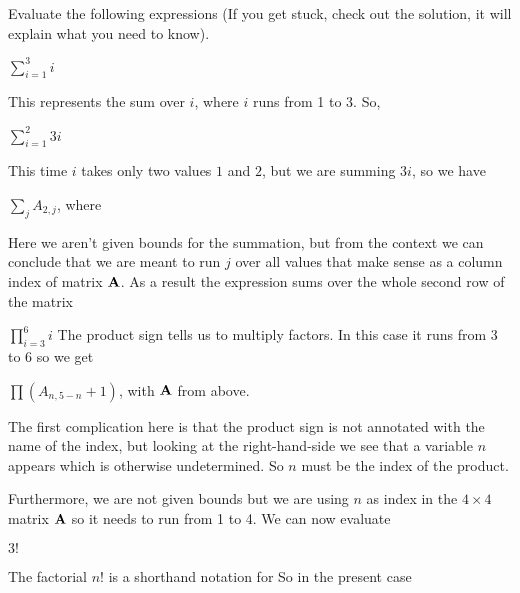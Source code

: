 
Evaluate the following expressions (If you get stuck, check out the solution, it will explain what you need to know). 

\subquestion $\sum_{i=1}^3 i$

\solution 
This represents the sum over $i$, where $i$ runs from 1 to 3. So, 

\subquestion $\sum_{i=1}^2 3i$

\solution 
This time $i$ takes only two values $1$ and $2$, but we are summing $3i$, so we have

\subquestion $\sum_j A_{2,j}$, where 

\solution 
Here we aren't given bounds for the summation, but from the context we can conclude that we are meant to run $j$ over all values that make sense as a column index of matrix ${\bf A}$.
As a result the expression sums over the whole second row of the matrix 

\subquestion
$\prod_{i=3}^6 i$ 
\solution
The product sign tells us to multiply factors. In this case it runs from 3 to 6 so we get 

\subquestion
$\prod (A_{n,5-n}+1)$, with $\bf A$ from above.

\solution
The first complication here is that the product sign is not annotated with the name of the index, but looking at the right-hand-side we see that a variable $n$ appears which is otherwise undetermined. So $n$ must be the index of the product. 

Furthermore, we are not given bounds but we are using $n$ as index in the $4\times 4$ matrix $\bf A$ so it needs to run from 1 to 4. We can now evaluate

\subquestion $3!$

\solution 
The factorial $n!$ is a shorthand notation for
So in the present case 
